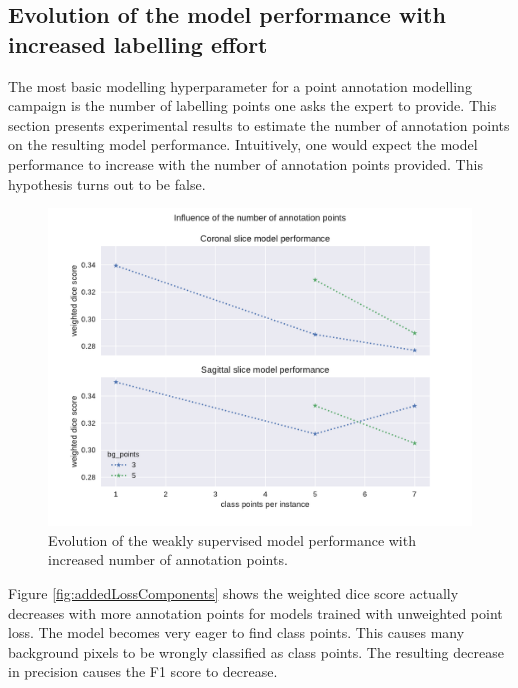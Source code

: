 \subsection{Evolution of the model performance with increased labelling effort\label{sec:numberofpoints}}
\par{
    The most basic modelling hyperparameter for a point annotation modelling campaign is the number of labelling points one asks the expert to provide.
    This section presents experimental results to estimate the number of annotation points on the resulting model performance.
    Intuitively, one would expect the model performance to increase with the number of annotation points provided.
    This hypothesis turns out to be false.
}
\begin{figure}
    \centering
    \includegraphics[width=.95\textwidth]{images/BlobPoints_influence.pdf}
    \caption{Evolution of the weakly supervised model performance with increased number of annotation points.\label{fig:points_influence}}
\end{figure}

\par{
    Figure \ref{fig:addedLossComponents} shows the weighted dice score actually decreases with more annotation points for models trained with unweighted point loss.
    The model becomes very eager to find class points. This causes many background pixels to be wrongly classified as class points.
    The resulting decrease in precision causes the F1 score to decrease.
}
